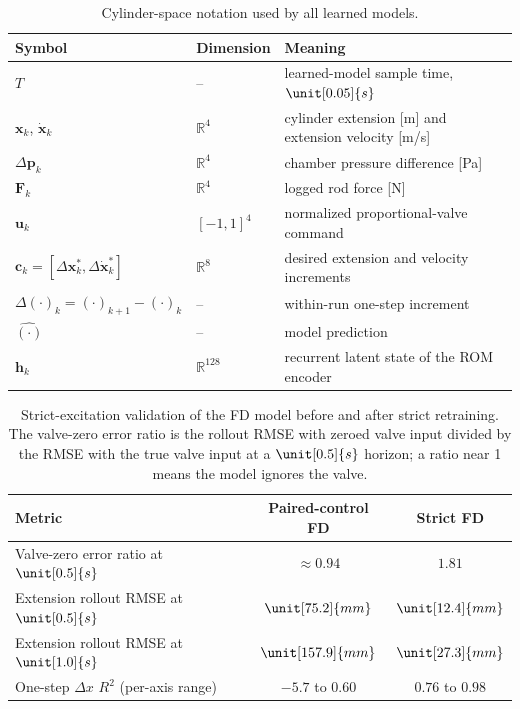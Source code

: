 \begin{table}[tb]
  \centering
  \caption{Cylinder-space notation used by all learned models.}
  \label{tab:models:notation}
  \begin{tabular}{llp{7.6cm}}
    \toprule
    Symbol & Dimension & Meaning \\
    \midrule
    $T$ & -- & learned-model sample time, $\unit[0.05]{s}$ \\
    $\bm{x}_k$, $\dot{\bm{x}}_k$ & $\mathbb{R}^4$ & cylinder extension [m] and extension velocity [m/s] \\
    $\Delta\bm{p}_k$ & $\mathbb{R}^4$ & chamber pressure difference [Pa] \\
    $\bm{F}_k$ & $\mathbb{R}^4$ & logged rod force [N] \\
    $\bm{u}_k$ & $[-1,1]^4$ & normalized proportional-valve command \\
    $\bm{c}_k = [\Delta\bm{x}^*_k, \Delta\dot{\bm{x}}^*_k]$ & $\mathbb{R}^8$ & desired extension and velocity increments \\
    $\Delta(\cdot)_k = (\cdot)_{k+1} - (\cdot)_k$ & -- & within-run one-step increment \\
    $\hat{(\cdot)}$ & -- & model prediction \\
    $\bm{h}_k$ & $\mathbb{R}^{128}$ & recurrent latent state of the ROM encoder \\
    \bottomrule
  \end{tabular}
\end{table}

\begin{table}[tb]
  \centering
  \caption{Strict-excitation validation of the FD model before and after
  strict retraining. The valve-zero error ratio is the rollout RMSE with
  zeroed valve input divided by the RMSE with the true valve input at a
  $\unit[0.5]{s}$ horizon; a ratio near 1 means the model ignores the valve.}
  \label{tab:models:fd-strict}
  \begin{tabular}{lcc}
    \toprule
    Metric & Paired-control FD & Strict FD \\
    \midrule
    Valve-zero error ratio at $\unit[0.5]{s}$ & $\approx 0.94$ & $1.81$ \\
    Extension rollout RMSE at $\unit[0.5]{s}$ & $\unit[75.2]{mm}$ & $\unit[12.4]{mm}$ \\
    Extension rollout RMSE at $\unit[1.0]{s}$ & $\unit[157.9]{mm}$ & $\unit[27.3]{mm}$ \\
    One-step $\Delta x$ $R^2$ (per-axis range) & $-5.7$ to $0.60$ & $0.76$ to $0.98$ \\
    \bottomrule
  \end{tabular}
\end{table}
